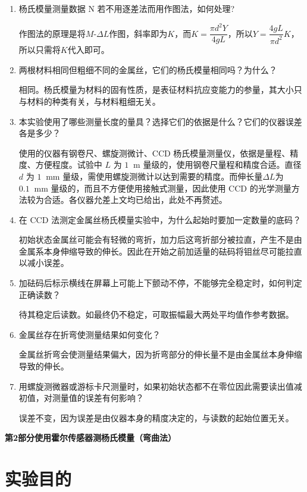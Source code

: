 \documentclass[11pt]{article}
\newcommand*{\unit}[1]{\mathop{}\!\mathrm{#1}}
\newcommand{\chapter}[2]{\begin{center}\bf\Large{第#1部分\quad #2}\end{center}}
\begin{document}
\begin{enumerate}
    \item 杨氏模量测量数据 N 若不用逐差法而用作图法，如何处理?
    
    作图法的原理是将$M$-$\Delta L$作图，斜率即为$K$，而$K = \dfrac{\pi d^2 Y}{4gL}$，所以$Y = \dfrac{4gL}{\pi d^2} K$，所以只需将$K$代入即可。
    \item 两根材料相同但粗细不同的金属丝，它们的杨氏模量相同吗？为什么？
    
    相同。杨氏模量为材料的固有性质，是表征材料抗应变能力的参量，其大小只与材料的种类有关，与材料粗细无关。
    \item 本实验使用了哪些测量长度的量具？选择它们的依据是什么？它们的仪器误差各是多少？
    
    使用的仪器有钢卷尺、螺旋测微计、CCD 杨氏模量测量仪，依据是量程、精度、方便程度。试验中 $L$ 为 $1\unit{m}$ 量级的，使用钢卷尺量程和精度合适。直径 $d$ 为 $1\unit{mm}$ 量级，需使用螺旋测微计以达到需要的精度。而伸长量$\Delta L$为 $0.1\unit{mm}$ 量级的，而且不方便使用接触式测量，因此使用 CCD 的光学测量方法较为合适。各仪器允差上文均已给出，此处不再赘述。
    \item 在 CCD 法测定金属丝杨氏模量实验中，为什么起始时要加一定数量的底码？
    
    初始状态金属丝可能会有轻微的弯折，加力后这弯折部分被拉直，产生不是由金属系本身伸缩导致的伸长。因此在开始之前加适量的砝码将钼丝尽可能拉直以减小误差。
    \item 加砝码后标示横线在屏幕上可能上下颤动不停，不能够完全稳定时，如何判定正确读数？
    
    待其稳定后读数。如最终仍不稳定，可取振幅最大两处平均值作参考数据。
    \item 金属丝存在折弯使测量结果如何变化？
    
    金属丝折弯会使测量结果偏大，因为折弯部分的伸长量不是由金属丝本身伸缩导致的伸长。
    \item 用螺旋测微器或游标卡尺测量时，如果初始状态都不在零位因此需要读出值减初值，对测量值的误差有何影响？
    
    误差不变，因为误差是由仪器本身的精度决定的，与读数的起始位置无关。
\end{enumerate}

\setcounter{section}{0}

\chapter{2}{使用霍尔传感器测杨氏模量（弯曲法）}

\section{实验目的}
\end{document}
